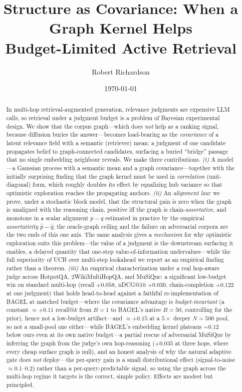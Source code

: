 \documentclass[11pt]{article}
\title{\textbf{Structure as Covariance: When a Graph Kernel Helps\\ Budget-Limited Active Retrieval}}
\author{Robert Richardson}
\date{\today}
\theoremstyle{plain}\newtheorem{theorem}{Theorem}\newtheorem{lemma}{Lemma}\newtheorem{proposition}{Proposition}
\theoremstyle{definition}\newtheorem{assumption}{Assumption}\newtheorem{remark}{Remark}
\begin{document}
\maketitle

\begin{abstract}
In multi-hop retrieval-augmented generation, relevance judgments are expensive LLM calls, so retrieval under a
judgment budget is a problem of Bayesian experimental design. We show that the corpus graph---which does
\emph{not} help as a ranking signal, because diffusion buries the answer---becomes load-bearing as the
\emph{covariance} of a latent relevance field with a semantic (retriever) mean: a judgment of one candidate
propagates belief to graph-connected candidates, surfacing a buried ``bridge'' passage that no single embedding
neighbour reveals. We make three contributions. \emph{(i)} A model---a Gaussian process with a semantic mean and a
graph covariance---together with the initially surprising finding that the graph kernel must be used in
\emph{correlation} (unit-diagonal) form, which roughly doubles its effect by equalizing hub variance so that
optimistic exploration reaches the propagating anchors. \emph{(ii)} An \emph{alignment law}: we prove, under a
stochastic block model, that the structural gain is zero when the graph is unaligned with the reasoning chain,
positive iff the graph is chain-\emph{assortative}, and monotone in a scalar alignment $p-q$ estimated in practice
by the empirical \emph{assortativity} $\hat p-\hat q$; the oracle-graph ceiling and the failure on adversarial
corpora are the two ends of this one axis. The same analysis gives a \emph{mechanism} for why optimistic
exploration suits this problem---the value of a judgment is the downstream surfacing it enables, a delayed quantity
that one-step value-of-information undervalues---while the full superiority of UCB over multi-step lookahead we
report as an empirical finding rather than a theorem. \emph{(iii)} An empirical characterization under a real
hop-aware judge across HotpotQA, 2WikiMultiHopQA, and MuSiQue: a significant low-budget win on standard multi-hop
(recall $+0.058$, nDCG@10 $+0.030$, chain-completion $+0.122$ at one judgment) that holds head-to-head against a
faithful re-implementation of BAGEL at matched budget---where the covariance advantage is \emph{budget-invariant}
(a constant $\approx+0.11$ recall@$k$ from $B{=}1$ to BAGEL's native $B{=}50$, controlling for the prior), hence not
a low-budget artifact---and $\approx+0.15$ at a $5\times$ deeper $N{=}500$ pool, so not a small-pool one either---while BAGEL's embedding kernel plateaus $\sim0.12$ below ours even at its own native
budget---a partial rescue of
adversarial MuSiQue by
inferring the graph from the judge's own hop-reasoning ($+0.035$ at three hops, where every cheap surface graph is
null), and an honest analysis of why the natural
adaptive gate does \emph{not} deploy---the per-query gain is a small distributional effect (signal-to-noise
$\approx 0.1$--$0.2$) rather than a per-query-predictable signal, so using the graph across the multi-hop regime
it targets is the correct, simple policy. Effects are modest but principled.
\end{abstract}
\end{document}
